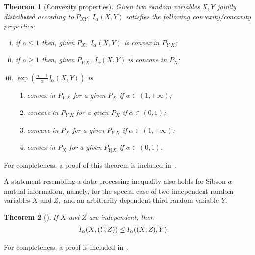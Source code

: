 \documentclass{article}
\newtheorem{theorem}{Theorem}
\numberwithin{theorem}{section}
\numberwithin{example}{section}
\numberwithin{remark}{section}
\numberwithin{definition}{section}
\newcommand{\revised}[1]{{\color{black} #1}}
\begin{document}
\begin{theorem}[Convexity properties]\label{thm:convexityproperties}
Given two random variables $X,Y$ jointly distributed according to $P_{XY}$, $I_\alpha(X,Y)$ satisfies the following convexity/concavity properties:
\begin{enumerate}[i)]

    \item if $\alpha\leq 1$ then, given $P_X$, $I_\alpha(X,Y)$ is convex in $P_{Y|X}$\label{prop:convexConditional};
    \item if $\alpha \geq 1$ then, given $P_{Y|X}$, $I_\alpha(X,Y)$ is concave in $P_X$\label{prop:concaveMarginal};
    \label{convexity} 
    \item $\exp\left(\frac{\alpha-1}{\alpha}I_\alpha(X,Y)\right)$ is \label{prop:convexExp}
    \begin{enumerate}
        \item  convex in $P_{Y|X}$ for a given $P_X$ if $\alpha\in (1,+\infty)$\label{prop:convexExpConditionalAlphaLarger1};
        \item  concave in $P_{Y|X}$ for a given $P_X$ if $\alpha\in (0,1)$\label{prop:convexExpConditionalAlphaSmaller1};
        \item concave in $P_X$ for a given $P_{Y|X}$ if $\alpha\in (1,+\infty)$\label{prop:concaveExpConditional};
        \item convex in $P_X$ for a given $P_{Y|X}$ if $\alpha\in (0,1)$\label{prop:convexExpConditional}.
    \end{enumerate}
\end{enumerate}
\end{theorem}
For completeness, a proof of this theorem is included in~.

\revised{A statement resembling a data-processing inequality also holds for Sibson $\alpha$-mutual information, namely, for the special case of two independent random variables $X$ and $Z,$ and an arbitrarily dependent third random variable $Y.$}

\begin{theorem}[{\cite[Lemma 2]{10161608}}]\label{thm:Riouletal}
If $X$ and $Z$ are independent, then
\begin{align}
    I_\alpha(X, (Y,Z)) & \le \revised{I_\alpha((X,Z) , Y)}.
\end{align}
\end{theorem}
For completeness, a proof is included in~.
\end{document}
